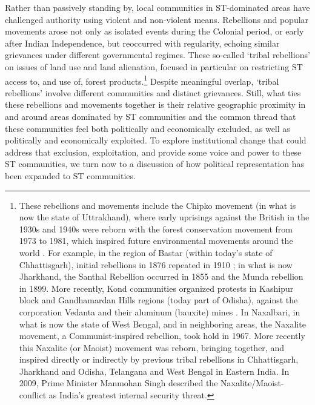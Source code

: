 \documentclass[12pt,reqno]{article}
\begin{document}
Rather than passively standing by, local communities in ST-dominated areas have challenged authority using violent and non-violent means. Rebellions and popular movements arose not only as isolated events during the Colonial period, or early after Indian Independence, but reoccurred with regularity, echoing similar grievances under different governmental regimes. These so-called `tribal rebellions' on issues of land use and land alienation, focused in particular on restricting ST access to, and use of, forest products.\footnote{These rebellions and movements include the Chipko movement (in what is now the state of Uttrakhand), where early uprisings against the British in the 1930s and 1940s were reborn with the forest conservation movement from 1973 to 1981, which inspired future environmental movements around the world \parencite{Guha2000}. For example, in the region of Bastar (within today's state of Chhattisgarh), initial rebellions in 1876 repeated in 1910 \parencite{Sundar2007, Verghese}; in what is now Jharkhand, the Santhal Rebellion occurred in 1855 and the Munda rebellion in 1899. More recently, Kond communities organized protests in Kashipur block and Gandhamardan Hills regions (today part of Odisha), against the corporation Vedanta and their aluminum (bauxite) mines \parencite{PadelDas}. In Naxalbari, in what is now the state of West Bengal, and in neighboring areas, the Naxalite movement, a Communist-inspired rebellion, took hold in 1967. More recently this Naxalite (or Maoist) movement was reborn, bringing together, and inspired directly or indirectly by previous tribal rebellions in Chhattisgarh, Jharkhand and Odisha, Telangana and West Bengal in Eastern India. In 2009, Prime Minister Manmohan Singh described the Naxalite/Maoist-conflict as India's greatest internal security threat.} Despite meaningful overlap, `tribal rebellions' involve different communities and distinct grievances. Still, what ties these rebellions and movements together is their relative geographic proximity in and around areas dominated by ST communities and the common thread that these communities feel both politically and economically excluded, as well as politically and economically exploited. To explore institutional change that could address that exclusion, exploitation, and provide some voice and power to these ST communities, we turn now to a discussion of how political representation has been expanded to ST communities. 



\end{document}
